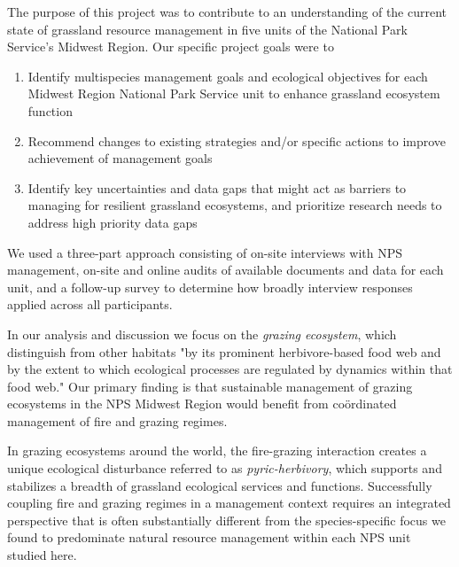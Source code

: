 The purpose of this project was to contribute to an understanding of the current state of grassland resource management in five units of the National Park Service's Midwest Region. 
Our specific project goals were to

\begin{enumerate}
	\item Identify multi\textendash species management goals and ecological objectives for each Midwest Region National Park Service unit to enhance grassland ecosystem function
	\item 	Recommend changes to existing strategies and/or specific actions to improve achievement of management goals 
	\item Identify key uncertainties and data gaps that might act as barriers to managing for resilient grassland ecosystems, and prioritize research needs to address high priority data gaps
\end{enumerate}

We used a three-part approach consisting of on-site interviews with NPS management, on-site and online audits of available documents and data for each unit, and a follow-up survey to determine how broadly interview responses applied across all participants. 

In our analysis and discussion we focus on the \emph{grazing ecosystem}, which \citet{frank1998} distinguish from other habitats "by its prominent herbivore-based food web and by the extent to which ecological processes are regulated by dynamics within that food web." 
Our primary finding is that sustainable management of grazing ecosystems in the NPS Midwest Region would benefit from co\"{o}rdinated management of fire and grazing regimes. 

In grazing ecosystems around the world, the fire-grazing interaction creates a unique ecological disturbance referred to as \emph{pyric-herbivory}, which supports and stabilizes a breadth of grassland ecological services and functions. 
Successfully coupling fire and grazing regimes in a management context requires an integrated perspective that is often substantially different from the species-specific focus we found to predominate natural resource management within each NPS unit studied here. 

